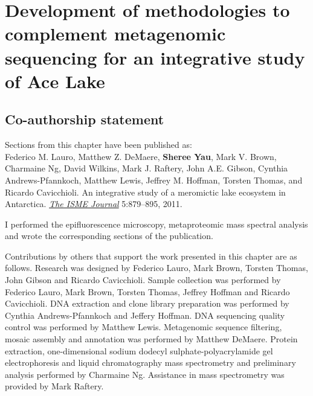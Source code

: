 \chapter[Development of methodologies to complement metagenomic sequencing for an integrative study of Ace Lake]{Development of methodologies to complement metagenomic sequencing for an integrative study of  Ace Lake}
\label{ch:ace}
\acresetall

\section*{Co-authorship statement}

Sections from this chapter have been published as:\\

Federico M. Lauro, Matthew Z. DeMaere, \textbf{Sheree Yau}, Mark V. Brown, Charmaine Ng,
David Wilkins, Mark J. Raftery, John A.E. Gibson, Cynthia Andrews-Pfannkoch, Matthew Lewis,
Jeffrey M. Hoffman, Torsten Thomas, and Ricardo Cavicchioli. 
An integrative study of a meromictic lake ecosystem in Antarctica. \emph{\underline{The ISME Journal}} 
5:879--895, 2011.

I performed the epifluorescence microscopy, metaproteomic mass spectral analysis and wrote the corresponding sections of the publication.

Contributions by others that support the work presented in this chapter are as follows.
Research was designed by Federico Lauro, Mark Brown, Torsten Thomas, John Gibson and Ricardo Cavicchioli.
Sample collection was performed by Federico Lauro, Mark Brown, Torsten Thomas, Jeffrey Hoffman and Ricardo Cavicchioli.
\textsc{DNA} extraction and clone library preparation was performed by Cynthia Andrews-Pfannkoch and Jeffery Hoffman.
\textsc{DNA} sequencing quality control was performed by Matthew Lewis.
Metagenomic sequence filtering, mosaic assembly and annotation was performed by Matthew DeMaere.
Protein extraction, one-dimensional sodium dodecyl sulphate-polyacrylamide gel electrophoresis and liquid chromatography mass spectrometry and preliminary analysis performed by Charmaine Ng.
Assistance in mass spectrometry was provided by Mark Raftery.
\newpage

